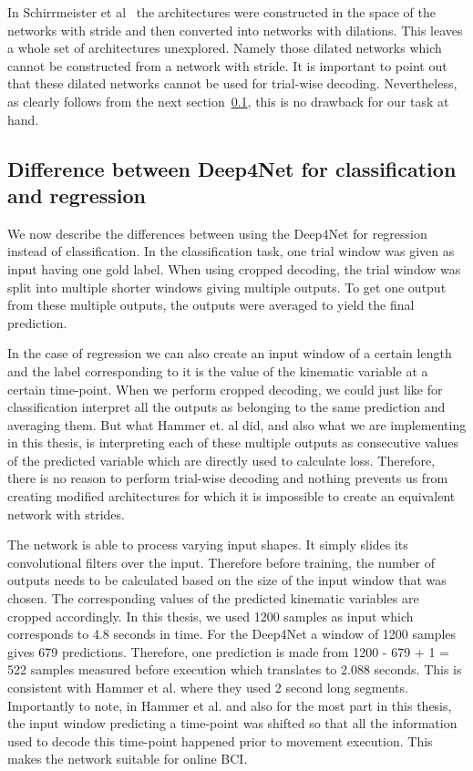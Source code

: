 In Schirrmeister et al~\cite{Schirrmeister_2017} the architectures were constructed in the space of the networks with stride and then converted into networks with dilations.
This leaves a whole set of architectures unexplored.
Namely those dilated networks which cannot be constructed from a network with stride.
It is important to point out that these dilated networks cannot be used for trial-wise decoding.
Nevertheless, as clearly follows from the next section~\ref{subsec:difference-between-deep4net-for-classification-and-regression}, this is no drawback for our task at hand.

\subsection{Difference between Deep4Net for classification and regression}\label{subsec:difference-between-deep4net-for-classification-and-regression}
We now describe the differences between using the Deep4Net for regression instead of classification.
In the classification task, one trial window was given as input having one gold label.
When using cropped decoding, the trial window was split into multiple shorter windows giving multiple outputs.
To get one output from these multiple outputs, the outputs were averaged to yield the final prediction.

In the case of regression we can also create an input window of a certain length and the label corresponding to it is the value of the kinematic variable at a certain time-point.
When we perform cropped decoding, we could just like for classification interpret all the outputs as belonging to the same prediction and averaging them.
But what Hammer et. al did, and also what we are implementing in this thesis, is interpreting each of these multiple outputs as consecutive values of the predicted variable which are directly used to calculate loss.
Therefore, there is no reason to perform trial-wise decoding and nothing prevents us from creating modified architectures for which it is impossible to create an equivalent network with strides.

The network is able to process varying input shapes.
It simply slides its convolutional filters over the input.
Therefore before training, the number of outputs needs to be calculated based on the size of the input window that was chosen.
The corresponding values of the predicted kinematic variables are cropped accordingly.
In this thesis, we used 1200 samples as input which corresponds to 4.8 seconds in time.
For the Deep4Net a window of 1200 samples gives 679 predictions.
Therefore, one prediction is made from 1200 - 679 + 1 = 522 samples measured before execution which translates to 2.088 seconds.
This is consistent with Hammer et al. where they used 2 second long segments.
Importantly to note, in Hammer et al. and also for the most part in this thesis, the input window predicting a time-point was shifted so that all the information used to decode this time-point happened prior to movement execution.
This makes the network suitable for online BCI.


